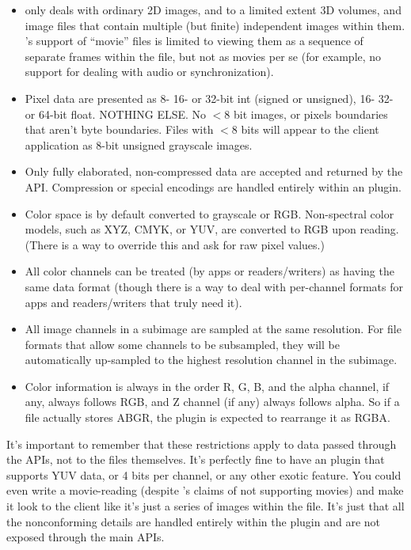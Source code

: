 \begin{itemize}
  \item \product only deals with ordinary 2D images, and to a limited
    extent 3D volumes, and image files that contain multiple (but
    finite) independent images within them.  \product's support of ``movie''
    files is limited to viewing them as a sequence of separate frames within
    the file, but not as movies per se (for example, no support for dealing
    with audio or synchronization).

  \item Pixel data are presented as 8- 16- or 32-bit int (signed or unsigned), 16-
    32- or 64-bit float.  NOTHING ELSE.  No $<8$ bit images, or pixels
    boundaries that aren't byte boundaries.  Files with $<8$ bits will
    appear to the client application as 8-bit unsigned grayscale images.

  \item Only fully elaborated, non-compressed data are accepted
    and returned by the API.  Compression or special encodings are
    handled entirely within an \product plugin.

  \item Color space is by default converted to grayscale or RGB. Non-spectral
    color models, such as
    XYZ, CMYK, or YUV, are converted to RGB upon reading. (There is a
    way to override this and ask for raw pixel values.)

  \item All color channels can be treated (by apps or readers/writers)
    as having the same data format (though there is a way to deal with
    per-channel formats for apps and readers/writers that truly need
    it).

  \item All image channels in a subimage are sampled at the same
    resolution.  For file formats that allow some channels to be
    subsampled, they will be automatically up-sampled to the highest
    resolution channel in the subimage.

  \item Color information is always in the order R, G, B, and the alpha
    channel, if any, always follows RGB, and Z channel (if any) always
    follows alpha.  So if a file actually stores ABGR, the plugin is
    expected to rearrange it as RGBA.

\end{itemize}

It's important to remember that these restrictions apply to data passed
through the APIs, not to the files themselves.  It's perfectly fine to
have an \product plugin that supports YUV data, or 4 bits per channel, or
any other exotic feature.  You could even write a movie-reading
\ImageInput (despite \product's claims of not supporting movies) and
make it look to the client like it's just a series of images within the
file.  It's just that all the nonconforming details are handled entirely
within the \product plugin and are not exposed through the main \product
APIs.


